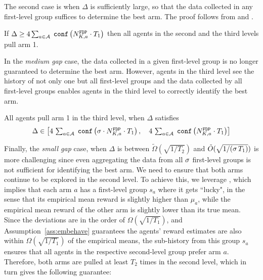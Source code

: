 The second case is when $\Delta$ is sufficiently large, so that
the data collected in any first-level group suffices to determine the best arm. The proof follows from  and .

\begin{lemma}\label{3levelbigcase}
If
  $ \Delta \geq 4 \sum_{a\in\A}\; \conf{\fdpN[a]\cdot T_1}$
then all agents in the second and the third levels pull arm 1.
\end{lemma}

In the \emph{medium gap} case, the data collected in a given first-level group is no longer guaranteed to determine the best arm. However, agents in the third level see the history of not only one but all first-level groups and the data collected by all first-level groups enables agents in the third level to correctly identify the best arm.


\begin{lemma}\label{3levelmedium}
  All agents pull arm 1 in the third level, when $\Delta$ satisfies
\[ \textstyle \Delta\in \left[
    4\,\sum_{a\in\A}\; \conf{\NG\cdot \fdpN[a]\cdot T_1},\quad
    4\,\sum_{a\in\A}\; \conf{\fdpN[a]\cdot T_1}
 \right] \]
\end{lemma}


Finally, the \emph{small gap} case, when  $\Delta$ is between
$\tilde\Omega(\sqrt{1/T_2})$ and $\tilde O(\sqrt{1/(\NG\, T_1)})$
is more challenging since even aggregating the data from all $\NG$
first-level groups is not sufficient for identifying the best arm.
We need to ensure that both arms continue to be explored in the second level.
To achieve this, we leverage , which implies
that each arm $a$ has a first-level group $s_a$ where it gets ``lucky", in the sense that its empirical mean reward is slightly higher than $\mu_a$, while the empirical mean reward of the other arm is slightly lower than its true mean. Since the
deviations are in the order of $\Omega(\sqrt{1/T_1})$, and Assumption~\ref{ass:embehave} guarantees the agents' reward estimates are also within $\Omega(\sqrt{1/T_1})$ of the empirical means, the sub-history
from this group $s_a$ ensures that all agents in the respective second-level group prefer arm $a$. Therefore, both arms are pulled at least $T_2$ times in the second level, which in turn gives the following guarantee:


